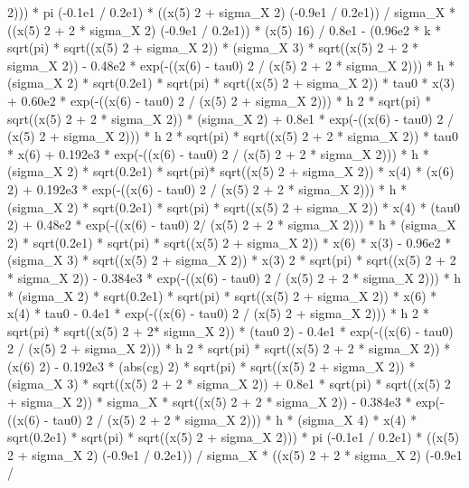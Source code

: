 \begin{maplegroup}
 2))) * pi  (-0.1e1 / 0.2e1) * ((x(5)  2 + sigma\_X  2)  (-0.9e1 / 0.2e1)) / sigma\_X * ((x(5)  2 + 2 * sigma\_X  2)  (-0.9e1 / 0.2e1)) * (x(5)  16) / 0.8e1 - (0.96e2 * k * sqrt(pi) * sqrt((x(5)  2 + sigma\_X  2)) * (sigma\_X  3) * sqrt((x(5)  2 + 2 * sigma\_X  2)) - 0.48e2 * exp(-((x(6) - tau0) 2 / (x(5)  2 + 2 * sigma\_X  2))) * h * (sigma\_X  2) * sqrt(0.2e1) * sqrt(pi) * sqrt((x(5)  2 + sigma\_X  2)) * tau0 * x(3) + 0.60e2 * exp(-((x(6) - tau0)  2 / (x(5)  2 + sigma\_X  2))) * h  2 * sqrt(pi) * sqrt((x(5)  2 + 2 * sigma\_X  2)) * (sigma\_X  2) + 0.8e1 * exp(-((x(6) - tau0)  2 / (x(5)  2 + sigma\_X  2))) * h  2 * sqrt(pi) * sqrt((x(5)  2 + 2 * sigma\_X  2)) * tau0 * x(6) + 0.192e3 * exp(-((x(6) - tau0)  2 / (x(5)  2 + 2 * sigma\_X  2))) * h * (sigma\_X  2) * sqrt(0.2e1) * sqrt(pi)* sqrt((x(5)  2 + sigma\_X  2)) * x(4) * (x(6)  2) + 0.192e3 * exp(-((x(6) - tau0)  2 / (x(5)  2 + 2 * sigma\_X  2))) * h * (sigma\_X  2) * sqrt(0.2e1) * sqrt(pi) * sqrt((x(5)  2 + sigma\_X  2)) * x(4) * (tau0  2) + 0.48e2 * exp(-((x(6) - tau0)  2/ (x(5)  2 + 2 * sigma\_X  2))) * h * (sigma\_X  2) * sqrt(0.2e1) * sqrt(pi) * sqrt((x(5)  2 + sigma\_X  2)) * x(6) * x(3) - 0.96e2 * (sigma\_X  3) * sqrt((x(5)  2 + sigma\_X  2)) * x(3)  2 * sqrt(pi) * sqrt((x(5)  2 + 2 * sigma\_X  2)) - 0.384e3 * exp(-((x(6) - tau0)  2 / (x(5)  2 + 2 * sigma\_X  2))) * h * (sigma\_X  2) * sqrt(0.2e1) * sqrt(pi) * sqrt((x(5)  2 + sigma\_X  2)) * x(6) * x(4) * tau0 - 0.4e1 * exp(-((x(6) - tau0)  2 / (x(5)  2 + sigma\_X  2))) * h  2 * sqrt(pi) * sqrt((x(5)  2 + 2* sigma\_X  2)) * (tau0  2) - 0.4e1 * exp(-((x(6) - tau0)  2 / (x(5)  2 + sigma\_X  2))) * h  2 * sqrt(pi) * sqrt((x(5)  2 + 2 * sigma\_X  2)) * (x(6)  2) - 0.192e3 * (abs(cg)  2) * sqrt(pi) * sqrt((x(5)  2 + sigma\_X  2)) * (sigma\_X  3) * sqrt((x(5)  2 + 2 * sigma\_X  2)) + 0.8e1 * sqrt(pi) * sqrt((x(5)  2 + sigma\_X  2)) * sigma\_X * sqrt((x(5)  2 + 2 * sigma\_X  2)) - 0.384e3 * exp(-((x(6) - tau0)  2 / (x(5)  2 + 2 * sigma\_X  2))) * h * (sigma\_X  4) * x(4) * sqrt(0.2e1) * sqrt(pi) * sqrt((x(5)  2 + sigma\_X  2))) * pi  (-0.1e1 / 0.2e1) * ((x(5)  2 + sigma\_X  2)  (-0.9e1 / 0.2e1)) / sigma\_X * ((x(5)  2 + 2 * sigma\_X  2)  (-0.9e1 / 
\end{maplegroup}
